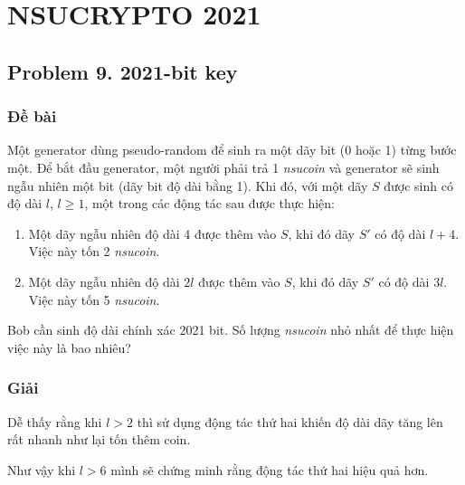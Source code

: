 \chapter{NSUCRYPTO 2021}

\section*{Problem 9. 2021-bit key}

\subsection*{Đề bài}

Một generator dùng pseudo-random để sinh ra một dãy bit (0 hoặc 1) từng bước một. Để bắt đầu generator, một người phải trả 1 \textit{nsucoin} và generator sẽ sinh ngẫu nhiên một bit (dãy bit độ dài bằng 1). Khi đó, với một dãy $S$ được sinh có độ dài $l$, $l \geqslant 1$, một trong các động tác sau được thực hiện:

\begin{enumerate}
    \item Một dãy ngẫu nhiên độ dài 4 được thêm vào $S$, khi đó dãy $S'$ có độ dài $l + 4$. Việc này tốn 2 \textit{nsucoin}.
    \item Một dãy ngẫu nhiên độ dài $2l$ được thêm vào $S$, khi đó dãy $S'$ có độ dài $3l$. Việc này tốn 5 \textit{nsucoin}.
\end{enumerate}

Bob cần sinh độ dài chính xác 2021 bit. Số lượng \textit{nsucoin} nhỏ nhất để thực hiện việc này là bao nhiêu?

\subsection*{Giải}

Dễ thấy rằng khi $l > 2$ thì sử dụng động tác thứ hai khiến độ dài dãy tăng lên rất nhanh như lại tốn thêm coin.

Như vậy khi $l > 6$ mình sẽ chứng minh rằng động tác thứ hai hiệu quả hơn.

